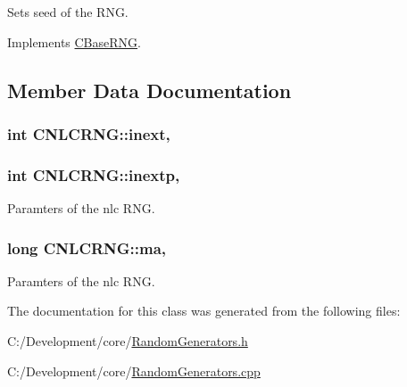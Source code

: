 Sets seed of the R\-N\-G. 



Implements \hyperlink{class_c_base_r_n_g_a56fbf75ca07b73954596ee04820e0b07}{C\-Base\-R\-N\-G}.



\subsection{Member Data Documentation}
\hypertarget{class_c_n_l_c_r_n_g_a47b1286233faf1258a8f80efceb9755f}{
\subsubsection[{inext}]{\setlength{\rightskip}{0pt plus 5cm}int C\-N\-L\-C\-R\-N\-G\-::inext\hspace{0.3cm}{\ttfamily [static]}, {\ttfamily [private]}}}\label{class_c_n_l_c_r_n_g_a47b1286233faf1258a8f80efceb9755f}
\hypertarget{class_c_n_l_c_r_n_g_a1494412ce498bba1816cded65eb5c7a8}{
\subsubsection[{inextp}]{\setlength{\rightskip}{0pt plus 5cm}int C\-N\-L\-C\-R\-N\-G\-::inextp\hspace{0.3cm}{\ttfamily [static]}, {\ttfamily [private]}}}\label{class_c_n_l_c_r_n_g_a1494412ce498bba1816cded65eb5c7a8}


Paramters of the nlc R\-N\-G. 

\hypertarget{class_c_n_l_c_r_n_g_a8914193c82393d27b6343f47dd750267}{
\subsubsection[{ma}]{\setlength{\rightskip}{0pt plus 5cm}long C\-N\-L\-C\-R\-N\-G\-::ma\hspace{0.3cm}{\ttfamily [static]}, {\ttfamily [private]}}}\label{class_c_n_l_c_r_n_g_a8914193c82393d27b6343f47dd750267}


Paramters of the nlc R\-N\-G. 



The documentation for this class was generated from the following files\-:\begin{DoxyCompactItemize}
\item 
C\-:/\-Development/core/\hyperlink{_random_generators_8h}{Random\-Generators.\-h}\item 
C\-:/\-Development/core/\hyperlink{_random_generators_8cpp}{Random\-Generators.\-cpp}\end{DoxyCompactItemize}
